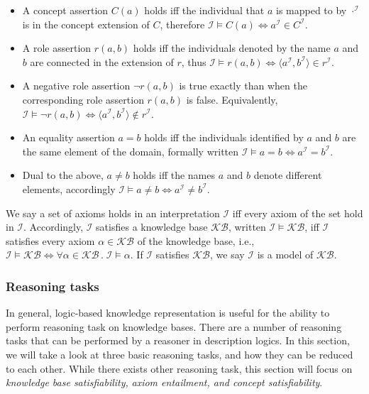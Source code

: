 \begin{itemize}
    \item A concept assertion $C(a)$ holds iff the individual that $a$ is mapped to by $\cdot^\mathcal{I}$ is in the concept extension of $C$, therefore $\mathcal{I} \vDash C (a) \iff a^\mathcal{I} \in C^\mathcal{I}$.
    \item A role assertion $r(a, b)$ holds iff the individuals denoted by the name $a$ and $b$ are connected in the extension of $r$, thus $\mathcal{I} \vDash r (a, b) \iff \langle a^\mathcal{I}, b^\mathcal{I} \rangle \in r^\mathcal{I}$.
    \item A negative role assertion $\lnot r (a, b)$ is true exactly than when the corresponding role assertion $r (a, b)$ is false. Equivalently,  $\mathcal{I} \vDash \lnot r (a, b) \iff \langle a^\mathcal{I}, b^\mathcal{I} \rangle \not\in r^\mathcal{I}$.
    \item An equality assertion $a = b$ holds iff the individuals identified by $a$ and $b$ are the same element of the domain, formally written $\mathcal{I} \vDash a = b \iff a^\mathcal{I} = b^\mathcal{I}$.
    \item Dual to the above, $a \not = b$ holds iff the names $a$ and $b$ denote different elements, accordingly $\mathcal{I} \vDash a \not= b \iff a^\mathcal{I} \not= b^\mathcal{I}$.
\end{itemize}

We say a set of axioms holds in an interpretation $\mathcal{I}$ iff every axiom of the set hold in $\mathcal{I}$. Accordingly, $\mathcal{I}$ satisfies a knowledge base $\mathcal{KB}$, written $\mathcal{I} \vDash \mathcal{KB}$, iff $\mathcal{I}$ satisfies every axiom $\alpha \in \mathcal{KB}$ of the knowledge base, i.e., $\mathcal{I} \vDash \mathcal{KB} \iff \forall \alpha \in \mathcal{KB} \, . \; \mathcal{I} \vDash \alpha$. If $\mathcal{I}$ satisfies $\mathcal{KB}$, we say $\mathcal{I}$ is a model of $\mathcal{KB}$.

\subsubsection{Reasoning tasks} \label{reasoning-tasks}

In general, logic-based knowledge representation is useful for the ability to perform reasoning task on knowledge bases. There are a number of reasoning tasks that can be performed by a reasoner in description logics. In this section, we will take a look at three basic reasoning tasks, and how they can be reduced to each other. While there exists other reasoning task, this section will focus on \emph{knowledge base satisfiability,} \emph{axiom entailment, and concept satisfiability}.

